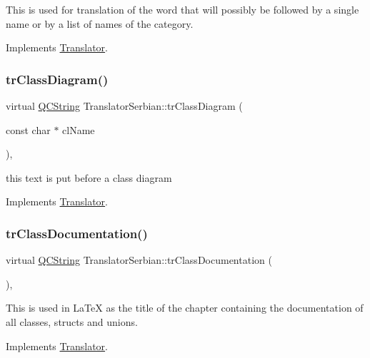 This is used for translation of the word that will possibly be followed by a single name or by a list of names of the category. 

Implements \mbox{\hyperlink{class_translator}{Translator}}.

\mbox{\label{class_translator_serbian_aea8f2fc9a71e37d9e953c973337c75b0}} 
\subsubsection{\texorpdfstring{trClassDiagram()}{trClassDiagram()}}
{\footnotesize\ttfamily virtual \mbox{\hyperlink{class_q_c_string}{Q\+C\+String}} Translator\+Serbian\+::tr\+Class\+Diagram (\begin{DoxyParamCaption}\item[{const char $\ast$}]{cl\+Name }\end{DoxyParamCaption})\hspace{0.3cm}{\ttfamily [inline]}, {\ttfamily [virtual]}}

this text is put before a class diagram 

Implements \mbox{\hyperlink{class_translator}{Translator}}.

\mbox{\label{class_translator_serbian_aa47e77c7d05c0a5d2113185f17804fe7}} 
\subsubsection{\texorpdfstring{trClassDocumentation()}{trClassDocumentation()}}
{\footnotesize\ttfamily virtual \mbox{\hyperlink{class_q_c_string}{Q\+C\+String}} Translator\+Serbian\+::tr\+Class\+Documentation (\begin{DoxyParamCaption}{ }\end{DoxyParamCaption})\hspace{0.3cm}{\ttfamily [inline]}, {\ttfamily [virtual]}}

This is used in La\+TeX as the title of the chapter containing the documentation of all classes, structs and unions. 

Implements \mbox{\hyperlink{class_translator}{Translator}}.

